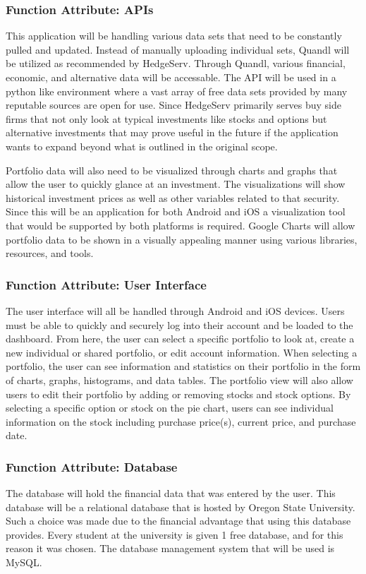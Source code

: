 \documentclass[onecolumn, draftclsnofoot,10pt, compsoc]{IEEEtran}
\begin{document}
\subsubsection{Function Attribute: APIs}
        This application will be handling various data sets that need to be constantly pulled and updated. Instead of manually uploading individual sets, Quandl will be utilized as recommended by HedgeServ. Through Quandl,
	various financial, economic, and alternative data will be accessable. The API will be used in a python like environment where a vast array of free data sets provided by many reputable sources are open for use.
	Since HedgeServ primarily serves buy side firms that not only look at typical investments like stocks and options but alternative investments that may prove useful in the future if the application wants to expand
	beyond what is outlined in the original scope. 
        
        Portfolio data will also need to be visualized through charts and graphs that allow the user to quickly glance at an investment. The visualizations will show historical investment prices as well as other
	variables related to that security. Since this will be an application for both Android and iOS a visualization tool that would be supported by both platforms is required. Google Charts will allow portfolio data to
	be shown in a visually appealing manner using various libraries, resources, and tools. 
        
\subsubsection{Function Attribute: User Interface}
        The user interface will all be handled through Android and iOS devices. Users must be able to quickly and
        securely log into their account and be loaded to the dashboard. From here, the user can select a specific
        portfolio to look at, create a new individual or shared portfolio, or edit account information.
        When selecting a portfolio, the user can see information and statistics on their portfolio in the 
        form of charts, graphs, histograms, and data tables. The portfolio view will also allow users to edit their
        portfolio by adding or removing stocks and stock options. By selecting a specific option or stock on the
        pie chart, users can see individual information on the stock including purchase price(s), current price,
        and purchase date.
        
\subsubsection{Function Attribute: Database}
        The database will hold the financial data that was entered by the user. This database will be a relational database that is hosted by Oregon State University. Such a choice was
        made due to the financial advantage that using this database provides. Every student at the university is given 1 free database, and for this reason it was chosen. The database
        management system that will be used is MySQL.
\end{document}
